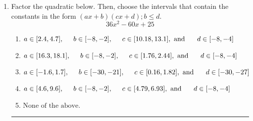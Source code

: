 \documentclass[14pt]{extbook}
\newcommand{\litem}[1]{\item#1\hspace*{-1cm}\rule{\textwidth}{0.4pt}}
\begin{document}
\begin{enumerate}
{\begin{enumerate}[label=\Alph*.]
\end{enumerate} }
\litem{
Factor the quadratic below. Then, choose the intervals that contain the constants in the form $(ax+b)(cx+d); b \leq d.$\[ 36x^{2} -60 x + 25 \]\begin{enumerate}[label=\Alph*.]
\item \( a \in [2.4, 4.7], \hspace*{5mm} b \in [-8, -2], \hspace*{5mm} c \in [10.18, 13.1], \text{ and } \hspace*{5mm} d \in [-8, -4] \)
\item \( a \in [16.3, 18.1], \hspace*{5mm} b \in [-8, -2], \hspace*{5mm} c \in [1.76, 2.44], \text{ and } \hspace*{5mm} d \in [-8, -4] \)
\item \( a \in [-1.6, 1.7], \hspace*{5mm} b \in [-30, -21], \hspace*{5mm} c \in [0.16, 1.82], \text{ and } \hspace*{5mm} d \in [-30, -27] \)
\item \( a \in [4.6, 9.6], \hspace*{5mm} b \in [-8, -2], \hspace*{5mm} c \in [4.79, 6.93], \text{ and } \hspace*{5mm} d \in [-8, -4] \)
\item \( \text{None of the above.} \)


\end{enumerate}}
\end{enumerate}
\end{document}

